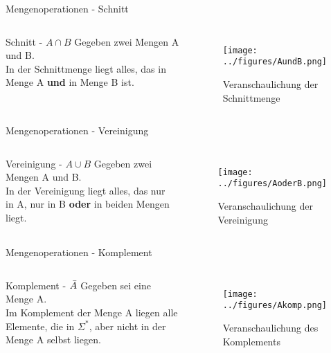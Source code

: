 \begin{frame}{Mengenoperationen - Schnitt}
\begin{columns}
    \begin{alertblock}{Schnitt - $A\cap B$}
    Gegeben zwei Mengen A und B.\\
    In der Schnittmenge liegt alles, das in Menge A \textbf{und} in Menge B ist.
    \end{alertblock}
\begin{figure}
    \centering
    \texttt{[image: ../figures/AundB.png]}
    \caption{Veranschaulichung der Schnittmenge}
    \label{fig:my_label}
\end{figure}
\end{columns}
\end{frame}

\begin{frame}{Mengenoperationen - Vereinigung}
\begin{columns}
    \begin{alertblock}{Vereinigung - $A\cup B$}
    Gegeben zwei Mengen A und B.\\
    In der Vereinigung liegt alles, das nur in A, nur in B \textbf{oder} in beiden Mengen liegt.
    \end{alertblock}
\begin{figure}
    \centering
    \texttt{[image: ../figures/AoderB.png]}
    \caption{Veranschaulichung der Vereinigung}
    \label{fig:my_label}
\end{figure}
\end{columns}
\end{frame}

\begin{frame}{Mengenoperationen - Komplement}
    \begin{columns}
    \begin{alertblock}{Komplement - $\Bar{A}$}
    Gegeben sei eine Menge A.\\
    Im Komplement der Menge A liegen alle Elemente, die in $\Sigma^{*}$, aber nicht in der Menge A selbst liegen.
    \end{alertblock}
\begin{figure}
    \centering
    \texttt{[image: ../figures/Akomp.png]}
    \caption{Veranschaulichung des Komplements}
    \label{fig:my_label}
\end{figure}
\end{columns}
\end{frame}

